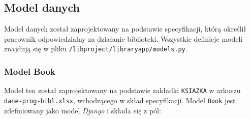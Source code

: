 \documentclass[twoside]{projektInzynierskiMS}
\begin{document}
\subsection{Model danych}

Model danych został zaprojektowany na podstawie specyfikacji, którą określił pracownik odpowiedzialny za działanie biblioteki. Wszystkie definicje modeli znajdują się w pliku \verb`/libproject/libraryapp/models.py`.

\subsubsection{Model Book}

Model ten został zaprojektowany na podstawie zakładki \verb`KSIAZKA` w arkuszu \verb`dane-prog-bibl.xlsx`, wchodzącego w skład specyfikacji. Model \verb`Book` jest zdefiniowany jako model \textit{Django} i składa się z pól:
\end{document}
